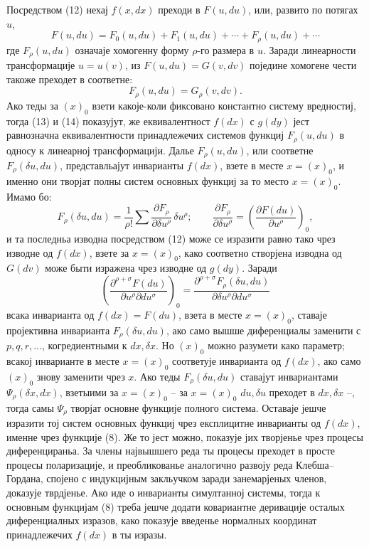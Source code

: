 ﻿\documentclass[11pt]{article}
\begin{document}
Посредством (12) нехај \(f(x,dx)\) преходи в \(F(u,du)\), или, развито по потягах \(u\),
\begin{equation}
F(u,du)=F_0(u,du)+F_1(u,du)+\cdots+F_\rho(u,du)+\cdots
\tag{13}
\end{equation}
где \(F_\rho(u,du)\) означаје хомогенну форму \(\rho\)-го размера в \(u\). Заради линеарности трансформације \(u=u(v)\), из \(F(u,du)=G(v,dv)\) поједине хомогене чести такоже преходет в соответне:
\begin{equation}
F_\rho(u,du)=G_\rho(v,dv).
\tag{14}
\end{equation}
Ако теды за \((x)_0\) взети какоје-коли фиксовано константно систему вредностиј, тогда (13) и (14) показујут, же еквивалентност \(f(dx)\) с \(g(dy)\) јест равнозначна еквивалентности принадлежечих системов функциј \(F_\rho(u,du)\) в односу к линеарној трансформацији. Далье \(F_\rho(u,du)\), или соответне \(F_\rho(\delta u,du)\), представльајут инварианты \(f(dx)\), взете в месте \(x=(x)_0\), и именно они творјат полны систем основных функциј за то место \(x=(x)_0\). Имамо бо:
\[
F_\rho(\delta u,du)=\frac1{\rho!}\sum
\frac{\partial F_\rho}{\partial \delta u^\rho}\,\delta u^\rho;
\qquad
\frac{\partial F_\rho}{\partial \delta u^\rho}
=\left(\frac{\partial F(du)}{\partial u^\rho}\right)_0,
\]
и та последньа изводна посредством (12) може се изразити равно тако чрез изводне од \(f(dx)\), взете за \(x=(x)_0\), како соответно створјена изводна од \(G(dv)\) може быти изражена чрез изводне од \(g(dy)\). Заради
\[
\left(\frac{\partial^{\rho+\sigma}F(du)}
{\partial u^\rho\partial du^\sigma}\right)_0
=
\frac{\partial^{\rho+\sigma}F_\rho(\delta u,du)}
{\partial\delta u^\rho\partial du^\sigma}
\]
всака инварианта од \(f(dx)=F(du)\), взета в месте \(x=(x)_0\), ставаје пројективна инварианта \(F_\rho(\delta u,du)\), ако само вышше диференциалы заменити с \(p,q,r,\ldots\), когредиентными к \(dx,\delta x\). Но \((x)_0\) можно разумети како параметр; всакој инварианте в месте \(x=(x)_0\) соответује инварианта од \(f(dx)\), ако само \((x)_0\) знову заменити чрез \(x\). Ако теды \(F_\rho(\delta u,du)\) ставајут инвариантами \(\Psi_\rho(\delta x,dx)\), взетыими за \(x=(x)_0\) -- за \(x=(x)_0\) \(du,\delta u\) преходет в \(dx,\delta x\) --, тогда самы \(\Psi_\rho\) творјат основне функције полного система. Оставаје јешче изразити тој систем основных функциј чрез експлицитне инварианты од \(f(dx)\), именне чрез функције (8). Же то јест можно, показује јих творјенье чрез процесы диференцираньа. За члены највышшего реда ты процесы преходет в просте процесы поларизације, и преобликованье аналогично развоју реда Клебша--Гордана, спојено с индукцијным закльучком заради занемарјеных членов, доказује тврдјенье. Ако иде о инварианты симултанној системы, тогда к основным функцијам (8) треба јешче додати ковариантне деривације осталых диференциалных изразов, како показује введенье нормалных координат принадлежечих \(f(dx)\) в ты изразы.
\end{document}

